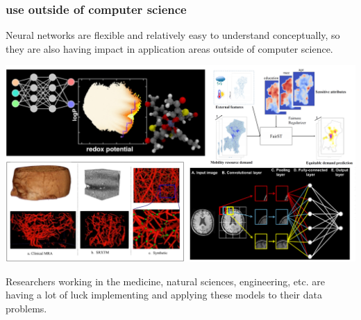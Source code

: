 \documentclass[handout,compress]{beamer}
\begin{document}
\begin{frame}
	\frametitle{use outside of computer science}
	\small
	Neural networks are flexible and relatively easy to understand conceptually, so they are also having impact in application areas outside of computer science. 
		\begin{center}
		\includegraphics[width=.7\textwidth]{science_apps.png}
	\end{center}
	
 	Researchers working in the medicine, natural sciences, engineering, etc. are having a lot of luck implementing and applying these models to their data problems.
\end{frame}
\end{document}
